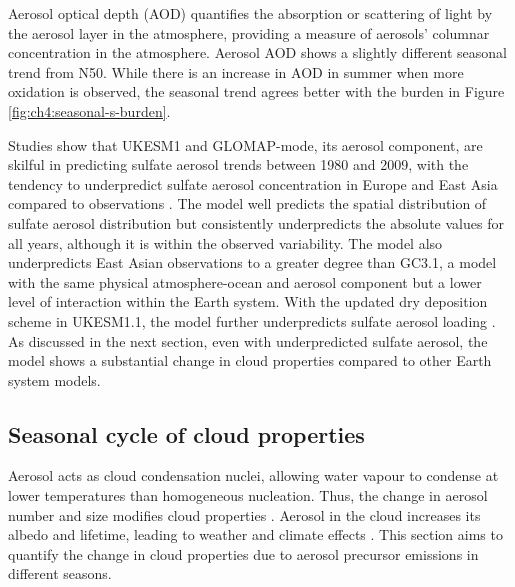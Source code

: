 Aerosol optical depth (AOD) quantifies the absorption or scattering of light by the aerosol layer in the atmosphere, providing a measure of aerosols' columnar concentration in the atmosphere. Aerosol AOD shows a slightly different seasonal trend from N50. While there is an increase in AOD in summer when more oxidation is observed, the seasonal trend agrees better with the  burden in Figure \ref{fig:ch4:seasonal-s-burden}. 


Studies show that UKESM1 and GLOMAP-mode, its aerosol component, are skilful in predicting sulfate aerosol trends between 1980 and 2009, with the tendency to underpredict sulfate aerosol concentration in Europe and East Asia compared to observations \citep{mannDescriptionEvaluationGLOMAPmode2010, mulcahyDescriptionEvaluationAerosol2020}.  The model well predicts the spatial distribution of sulfate aerosol distribution but consistently underpredicts the absolute values for all years, although it is within the observed variability. The model also underpredicts East Asian observations to a greater degree than GC3.1, a model with the same physical atmosphere-ocean and aerosol component but a lower level of interaction within the Earth system. With the updated dry deposition scheme in UKESM1.1, the model further underpredicts sulfate aerosol loading \citep{hardacreEvaluationSO2SO422021}. As discussed in the next section, even with underpredicted sulfate aerosol, the model shows a substantial change in cloud properties compared to other Earth system models. 


\subsection{Seasonal cycle of cloud properties}

Aerosol acts as cloud condensation nuclei, allowing water vapour to condense at lower temperatures than homogeneous nucleation. Thus, the change in aerosol number and size modifies cloud properties \citep[e.g. ][]{rosenfeldGlobalObservationsAerosolcloudprecipitationclimate2014, boucherCloudsAerosols2014,persadAerosolsMustBe2022}. Aerosol in the cloud increases its albedo and lifetime, leading to weather and climate effects \citep{twomeyInfluencePollutionShortwave1977, albrechtAerosolsCloudMicrophysics1989}. This section aims to quantify the change in cloud properties due to aerosol precursor emissions in different seasons.

